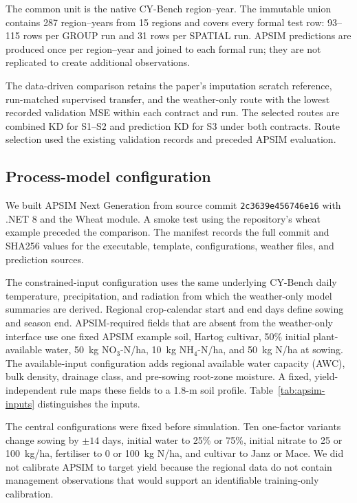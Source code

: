 \documentclass[runningheads]{venue/lncs/llncs}
\begin{document}
The common unit is the native CY-Bench region--year. The immutable union contains 287 region--years from 15 regions and covers every formal test row: 93--115 rows per GROUP run and 31 rows per SPATIAL run. APSIM predictions are produced once per region--year and joined to each formal run; they are not replicated to create additional observations.

The data-driven comparison retains the paper's imputation scratch reference, run-matched supervised transfer, and the weather-only route with the lowest recorded validation MSE within each contract and run. The selected routes are combined KD for S1--S2 and prediction KD for S3 under both contracts. Route selection used the existing validation records and preceded APSIM evaluation.

\subsection{Process-model configuration}

We built APSIM Next Generation \cite{Holzworth2018APSIMNextGen} from source commit \texttt{2c3639e456746e16} with .NET 8 and the Wheat module. A smoke test using the repository's wheat example preceded the comparison. The manifest records the full commit and SHA256 values for the executable, template, configurations, weather files, and prediction sources.

The constrained-input configuration uses the same underlying CY-Bench daily temperature, precipitation, and radiation from which the weather-only model summaries are derived. Regional crop-calendar start and end days define sowing and season end. APSIM-required fields that are absent from the weather-only interface use one fixed APSIM example soil, Hartog cultivar, 50\% initial plant-available water, 50~kg NO$_3$-N/ha, 10~kg NH$_4$-N/ha, and 50~kg N/ha at sowing. The available-input configuration adds regional available water capacity (AWC), bulk density, drainage class, and pre-sowing root-zone moisture. A fixed, yield-independent rule maps these fields to a 1.8-m soil profile. Table~\ref{tab:apsim-inputs} distinguishes the inputs.



The central configurations were fixed before simulation. Ten one-factor variants change sowing by $\pm14$ days, initial water to 25\% or 75\%, initial nitrate to 25 or 100~kg/ha, fertiliser to 0 or 100~kg N/ha, and cultivar to Janz or Mace. We did not calibrate APSIM to target yield because the regional data do not contain management observations that would support an identifiable training-only calibration.
\end{document}
